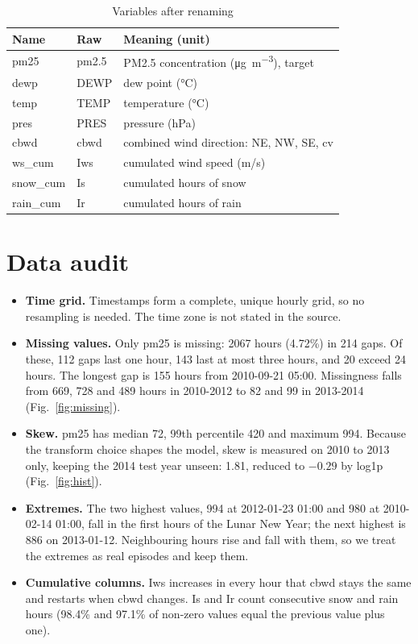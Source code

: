 \documentclass[conference]{IEEEtran}
\begin{document}
\begin{table}[h]
\centering
\caption{Variables after renaming}
\label{tab:cols}
\begin{tabular}{@{}lll@{}}
\toprule
Name & Raw & Meaning (unit) \\
\midrule
pm25 & pm2.5 & PM2.5 concentration (\si{\micro\gram\per\cubic\metre}), target \\
dewp & DEWP & dew point (\si{\celsius}) \\
temp & TEMP & temperature (\si{\celsius}) \\
pres & PRES & pressure (hPa) \\
cbwd & cbwd & combined wind direction: NE, NW, SE, cv \\
ws\_cum & Iws & cumulated wind speed (m/s) \\
snow\_cum & Is & cumulated hours of snow \\
rain\_cum & Ir & cumulated hours of rain \\
\bottomrule
\end{tabular}
\end{table}

\section{Data audit}
\begin{itemize}
\item \textbf{Time grid.} Timestamps form a complete, unique hourly grid, so no resampling is needed. The time zone is not stated in the source.
\item \textbf{Missing values.} Only pm25 is missing: \num{2067} hours (4.72\%) in 214 gaps. Of these, 112 gaps last one hour, 143 last at most three hours, and 20 exceed 24 hours. The longest gap is 155 hours from 2010-09-21 05:00. Missingness falls from 669, 728 and 489 hours in 2010-2012 to 82 and 99 in 2013-2014 (Fig.~\ref{fig:missing}).
\item \textbf{Skew.} pm25 has median 72, 99th percentile 420 and maximum 994. Because the transform choice shapes the model, skew is measured on 2010 to 2013 only, keeping the 2014 test year unseen: 1.81, reduced to $-0.29$ by log1p (Fig.~\ref{fig:hist}).
\item \textbf{Extremes.} The two highest values, 994 at 2012-01-23 01:00 and 980 at 2010-02-14 01:00, fall in the first hours of the Lunar New Year; the next highest is 886 on 2013-01-12. Neighbouring hours rise and fall with them, so we treat the extremes as real episodes and keep them.
\item \textbf{Cumulative columns.} Iws increases in every hour that cbwd stays the same and restarts when cbwd changes. Is and Ir count consecutive snow and rain hours (98.4\% and 97.1\% of non-zero values equal the previous value plus one).
\end{itemize}
\end{document}
